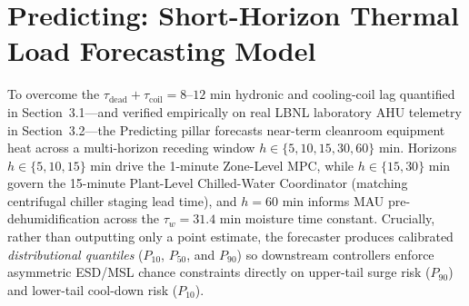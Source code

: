 %
%

\section{Predicting: Short-Horizon Thermal Load Forecasting Model}
\label{sec:forecasting}

To overcome the $\tau_{\text{dead}} + \tau_{\text{coil}} = 8\text{--}12\text{ min}$ hydronic and cooling-coil lag quantified in Section~3.1---and verified empirically on real LBNL laboratory AHU telemetry in Section~3.2---the Predicting pillar forecasts near-term cleanroom equipment heat across a multi-horizon receding window $h \in \{5, 10, 15, 30, 60\}\text{ min}$. Horizons $h \in \{5, 10, 15\}\text{ min}$ drive the 1-minute Zone-Level MPC, while $h \in \{15, 30\}\text{ min}$ govern the 15-minute Plant-Level Chilled-Water Coordinator (matching centrifugal chiller staging lead time), and $h = 60\text{ min}$ informs MAU pre-dehumidification across the $\tau_w = 31.4\text{ min}$ moisture time constant. Crucially, rather than outputting only a point estimate, the forecaster produces calibrated \emph{distributional quantiles} ($P_{10}$, $P_{50}$, and $P_{90}$) so downstream controllers enforce asymmetric ESD/MSL chance constraints directly on upper-tail surge risk ($P_{90}$) and lower-tail cool-down risk ($P_{10}$).

